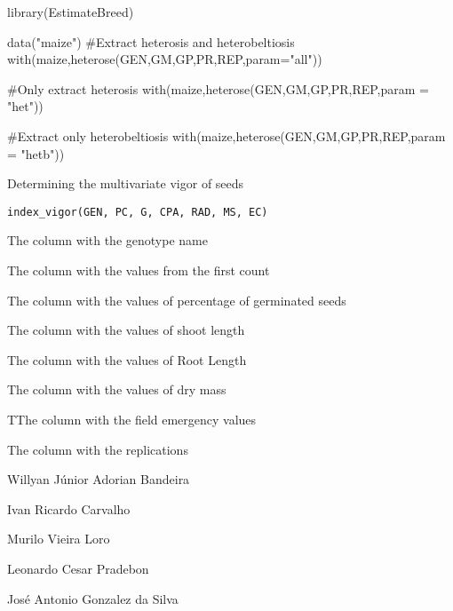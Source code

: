 \documentclass[a4paper]{book}
\begin{document}
%
\begin{Examples}
\begin{ExampleCode}

library(EstimateBreed)

data("maize")
#Extract heterosis and heterobeltiosis
with(maize,heterose(GEN,GM,GP,PR,REP,param="all"))

#Only extract heterosis
with(maize,heterose(GEN,GM,GP,PR,REP,param = "het"))

#Extract only heterobeltiosis
with(maize,heterose(GEN,GM,GP,PR,REP,param = "hetb"))

\end{ExampleCode}
\end{Examples}
%
\begin{Description}
Determining the multivariate vigor of seeds
\end{Description}
%
\begin{Usage}
\begin{verbatim}
index_vigor(GEN, PC, G, CPA, RAD, MS, EC)
\end{verbatim}
\end{Usage}
%
\begin{Arguments}
\begin{ldescription}
\item[\code{GEN}] The column with the genotype name

\item[\code{PC}] The column with the values from the first count

\item[\code{G}] The column with the values of percentage of germinated seeds

\item[\code{CPA}] The column with the values of shoot length

\item[\code{RAD}] The column with the values of Root Length

\item[\code{MS}] The column with the values of dry mass

\item[\code{EC}] TThe column with the field emergency values

\item[\code{REP}] The column with the replications
\end{ldescription}
\end{Arguments}
%
\begin{Author}
Willyan Júnior Adorian Bandeira

Ivan Ricardo Carvalho

Murilo Vieira Loro

Leonardo Cesar Pradebon

José Antonio Gonzalez da Silva
\end{Author}
\end{document}
